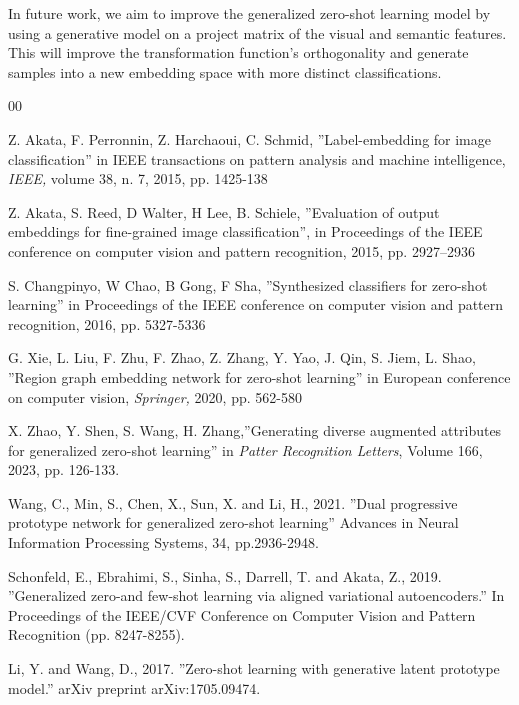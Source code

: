 \documentclass{article}
\begin{document}
In future work, we aim to improve the generalized zero-shot learning model by using a generative model on a project matrix of the visual and semantic features. This will improve the transformation function's orthogonality and generate samples into a new embedding space with more distinct classifications.


%  
%  

\newpage
\begin{thebibliography}{00}

 Z. Akata, F. Perronnin, Z. Harchaoui, C. Schmid, ''Label-embedding for image classification'' in IEEE transactions on pattern analysis and machine intelligence, \emph{IEEE,} volume 38, n. 7, 2015, pp. 1425-138

 Z. Akata, S. Reed, D Walter, H Lee, B. Schiele, ''Evaluation of output embeddings for fine-grained image classification'', in Proceedings of the IEEE conference on computer vision and pattern recognition, 2015, pp. 2927--2936

 S. Changpinyo, W Chao, B Gong, F Sha,  ''Synthesized classifiers for zero-shot learning'' in Proceedings of the IEEE conference on computer vision and pattern recognition, 2016, pp. 5327-5336

 G. Xie,  L. Liu, F. Zhu, F. Zhao, Z. Zhang, Y. Yao, J. Qin, S. Jiem, L. Shao, ''Region graph embedding network for zero-shot learning'' in European conference on computer vision, \emph{Springer,} 2020, pp. 562-580

 X. Zhao, Y. Shen, S. Wang, H. Zhang,''Generating diverse augmented attributes for generalized zero-shot learning'' in \emph{Patter Recognition Letters}, Volume 166, 2023, pp. 126-133.

 Wang, C., Min, S., Chen, X., Sun, X. and Li, H., 2021. ''Dual progressive prototype network for generalized zero-shot learning'' Advances in Neural Information Processing Systems, 34, pp.2936-2948.

 Schonfeld, E., Ebrahimi, S., Sinha, S., Darrell, T. and Akata, Z., 2019. ''Generalized zero-and few-shot learning via aligned variational autoencoders.'' In Proceedings of the IEEE/CVF Conference on Computer Vision and Pattern Recognition (pp. 8247-8255).

 Li, Y. and Wang, D., 2017. ''Zero-shot learning with generative latent prototype model.'' arXiv preprint arXiv:1705.09474.


\end{thebibliography}
\end{document}
